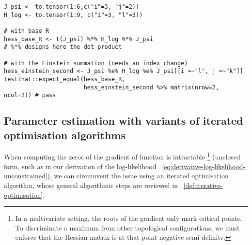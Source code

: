 \documentclass[long, final]{jobim}
\begin{document}
\begin{lstlisting}[caption={Computation of the Second part of the Hessian},label={lst:second-hessian}]
J_psi <- to.tensor(1:6,c("i"=3, "j"=2))
H_log <- to.tensor(1:9, c("i"=3, "l"=3))

# with base R
hess_base_R <- t(J_psi) %*% H_log %*% J_psi 
# %*% designs here the dot product

# with the Einstein summation (needs an index change)
hess_einstein_second <- J_psi %e% H_log %e% J_psi[[i =~"l", j =~"k"]]
testthat::expect_equal(hess_base_R, 
                       hess_einstein_second %>% matrix(nrow=2, ncol=2)) # pass
\end{lstlisting}

\subsection{Parameter estimation with variants of iterated optimisation algorithms}
\label{subsec:Levenberg–Marquardt}

When computing the zeros of the gradient of function is intractable \footnote{In a multivariate setting, the roots of the gradient only mark critical points. To discriminate a maximum from other topological configurations, we must enforce that the Hessian matrix is at that point negative semi-definite.} (unclosed form, such as in our derivation of the log-likelihood \equationname~\ref{eq:derivative-log-likelihood-unconstrained}), we can circumvent the issue using an iterated optimisation algorithm, whose general algorithmic steps are reviewed in ~\ref{def:iterative-optimisation}.
\end{document}
